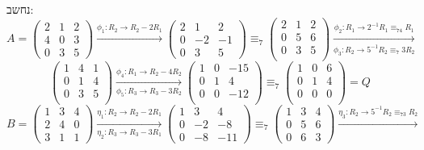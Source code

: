 \documentclass{article}
\begin{document}
נחשב:
\[
    A = \begin{pmatrix}
        2 & 1 & 2 \\
        4 & 0 & 3 \\
        0 & 3 & 5
    \end{pmatrix}
    \xrightarrow{\phi_1: R_2\rightarrow R_2-2R_1}
    \begin{pmatrix}
        2 & 1  & 2  \\
        0 & -2 & -1 \\
        0 & 3  & 5
    \end{pmatrix}
    \equiv_7
    \begin{pmatrix}
        2 & 1 & 2 \\
        0 & 5 & 6 \\
        0 & 3 & 5 \\
    \end{pmatrix}
    \xrightarrow[\phi_3: R_2\rightarrow 5^{-1}R_2\equiv_7 3R_2]{\phi_2: R_1\rightarrow 2^{-1}R_1\equiv_74R_1}
\]
\[
    \begin{pmatrix}
        1 & 4 & 1 \\
        0 & 1 & 4 \\
        0 & 3 & 5 \\
    \end{pmatrix}
    \xrightarrow[\phi_5: R_3\rightarrow R_3-3R_2]{\phi_4: R_1\rightarrow R_2-4R_2}
    \begin{pmatrix}
        1 & 0 & -15 \\
        0 & 1 & 4   \\
        0 & 0 & -12 \\
    \end{pmatrix}
    \equiv_7
    \begin{pmatrix}
        1 & 0 & 6 \\
        0 & 1 & 4 \\
        0 & 0 & 0 \\
    \end{pmatrix} =
    Q
\]
\[
    B = \begin{pmatrix}
        1 & 3 & 4 \\
        2 & 4 & 0 \\
        3 & 1 & 1
    \end{pmatrix}
    \xrightarrow[\eta_2: R_3\rightarrow R_3-3R_1]{\eta_1: R_2\rightarrow R_2-2R_1}
    \begin{pmatrix}
        1 & 3  & 4   \\
        0 & -2 & -8  \\
        0 & -8 & -11
    \end{pmatrix}
    \equiv_7
    \begin{pmatrix}
        1 & 3 & 4 \\
        0 & 5 & 6 \\
        0 & 6 & 3
    \end{pmatrix}
    \xrightarrow{\eta_3: R_2\rightarrow 5^{-1}R_2\equiv_73R_2}
\]
\end{document}
